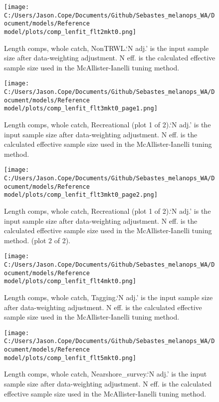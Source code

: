 \documentclass[11pt,
  english,
  letterpaper,
]{article}
\begin{document}
\begin{figure}
\centering
\texttt{[image: C:/Users/Jason.Cope/Documents/Github/Sebastes\_melanops\_WA/Document/models/Reference model/plots/comp\_lenfit\_flt2mkt0.png]}
\caption{Length comps, whole catch, NonTRWL.`N adj.' is the input sample size after data-weighting adjustment. N eff. is the calculated effective sample size used in the McAllister-Ianelli tuning method.\label{fig:comp_lenfit_flt2mkt0}}
\end{figure}

\begin{figure}
\centering
\texttt{[image: C:/Users/Jason.Cope/Documents/Github/Sebastes\_melanops\_WA/Document/models/Reference model/plots/comp\_lenfit\_flt3mkt0\_page1.png]}
\caption{Length comps, whole catch, Recreational (plot 1 of 2).`N adj.' is the input sample size after data-weighting adjustment. N eff. is the calculated effective sample size used in the McAllister-Ianelli tuning method.\label{fig:comp_lenfit_flt3mkt0_page1}}
\end{figure}

\begin{figure}
\centering
\texttt{[image: C:/Users/Jason.Cope/Documents/Github/Sebastes\_melanops\_WA/Document/models/Reference model/plots/comp\_lenfit\_flt3mkt0\_page2.png]}
\caption{Length comps, whole catch, Recreational (plot 1 of 2).`N adj.' is the input sample size after data-weighting adjustment. N eff. is the calculated effective sample size used in the McAllister-Ianelli tuning method. (plot 2 of 2).\label{fig:comp_lenfit_flt3mkt0_page2}}
\end{figure}

\begin{figure}
\centering
\texttt{[image: C:/Users/Jason.Cope/Documents/Github/Sebastes\_melanops\_WA/Document/models/Reference model/plots/comp\_lenfit\_flt4mkt0.png]}
\caption{Length comps, whole catch, Tagging.`N adj.' is the input sample size after data-weighting adjustment. N eff. is the calculated effective sample size used in the McAllister-Ianelli tuning method.\label{fig:comp_lenfit_flt4mkt0}}
\end{figure}

\begin{figure}
\centering
\texttt{[image: C:/Users/Jason.Cope/Documents/Github/Sebastes\_melanops\_WA/Document/models/Reference model/plots/comp\_lenfit\_flt5mkt0.png]}
\caption{Length comps, whole catch, Nearshore\_survey.`N adj.' is the input sample size after data-weighting adjustment. N eff. is the calculated effective sample size used in the McAllister-Ianelli tuning method.\label{fig:comp_lenfit_flt5mkt0}}
\end{figure}
\end{document}
